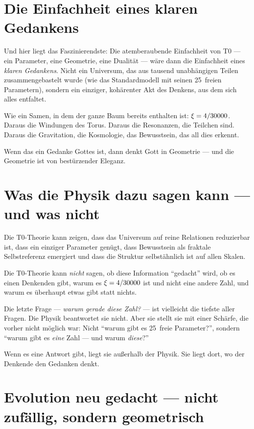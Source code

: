 \section{Die Einfachheit eines klaren Gedankens}

Und hier liegt das Faszinierendste: Die atemberaubende Einfachheit von T0 --- ein Parameter, eine Geometrie, eine Dualität --- wäre dann die Einfachheit eines \emph{klaren Gedankens}. Nicht ein Universum, das aus tausend unabhängigen Teilen zusammengebastelt wurde (wie das Standardmodell mit seinen 25~freien Parametern), sondern ein einziger, kohärenter Akt des Denkens, aus dem sich alles entfaltet.

Wie ein Samen, in dem der ganze Baum bereits enthalten ist: $\xi = 4/30000$. Daraus die Windungen des Torus. Daraus die Resonanzen, die Teilchen sind. Daraus die Gravitation, die Kosmologie, das Bewusstsein, das all dies erkennt.

Wenn das ein Gedanke Gottes ist, dann denkt Gott in Geometrie --- und die Geometrie ist von bestürzender Eleganz.

\section{Was die Physik dazu sagen kann --- und was nicht}

Die T0-Theorie kann zeigen, dass das Universum auf reine Relationen reduzierbar ist, dass ein einziger Parameter genügt, dass Bewusstsein als fraktale Selbstreferenz emergiert und dass die Struktur selbstähnlich ist auf allen Skalen.

Die T0-Theorie kann \emph{nicht} sagen, ob diese Information \enquote{gedacht} wird, ob es einen Denkenden gibt, warum es $\xi = 4/30000$ ist und nicht eine andere Zahl, und warum es überhaupt etwas gibt statt nichts.

Die letzte Frage --- \emph{warum gerade diese Zahl?} --- ist vielleicht die tiefste aller Fragen. Die Physik beantwortet sie nicht. Aber sie stellt sie mit einer Schärfe, die vorher nicht möglich war: Nicht \enquote{warum gibt es 25~freie Parameter?}, sondern \enquote{warum gibt es \emph{eine} Zahl --- und warum \emph{diese}?}

Wenn es eine Antwort gibt, liegt sie außerhalb der Physik. Sie liegt dort, wo der Denkende den Gedanken denkt.

\section{Evolution neu gedacht --- nicht zufällig, sondern geometrisch}


